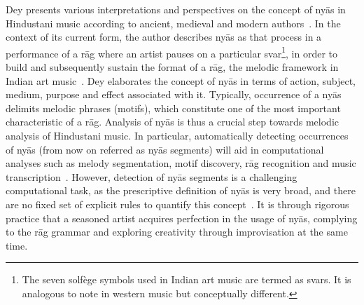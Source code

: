 {{%


Dey presents various interpretations and perspectives on the concept of ny\={a}s in Hindustani music according to ancient, medieval and modern authors~\cite{Dey2008}. In the context of its current form, the author describes ny\={a}s as that process in a performance of a r\={a}g where an artist pauses on a particular svar\footnote{The seven solf\`{e}ge symbols used in Indian art music are termed as svars. It is analogous to note in western music but conceptually different.}, in order to build and subsequently sustain the format of a r\={a}g, the melodic framework in Indian art music~\cite[p. 70]{Dey2008}\cite{KKG_SS13}. Dey elaborates the concept of ny\={a}s in terms of action, subject, medium, purpose and effect associated with it. Typically, occurrence of a ny\={a}s delimits melodic phrases (motifs), which constitute one of the most important characteristic of a r\={a}g. Analysis of ny\={a}s is thus a crucial step towards melodic analysis of Hindustani music. In particular, automatically detecting occurrences of ny\={a}s (from now on referred as ny\={a}s segments) will aid in computational analyses such as melody segmentation, motif discovery, r\={a}g recognition and music transcription~\cite{GopalJNMR2012, Rao2014}. However, detection of ny\={a}s segments is a challenging computational task, as the prescriptive definition of ny\={a}s is very broad, and there are no fixed set of explicit rules to quantify this concept~\cite[p. 73]{Dey2008}. It is through rigorous practice that a seasoned artist acquires perfection in the usage of ny\={a}s, complying to the r\={a}g grammar and exploring creativity through improvisation at the same time. 

}}
